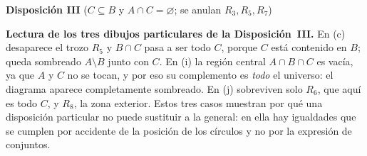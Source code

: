 \documentclass[11pt]{article}
\def\eA{(-1.1,0) circle (1.5)}
\def\eB{(0.9,0) circle (1.7)}
\def\eC{(1.35,0) circle (0.8)}
\def\Uniii{(-3.05,-2.15) rectangle (3.05,2.15)}
\newcommand{\eAin}{\clip \eA;}
\newcommand{\eAout}{\clip \Uniii \eA;}
\newcommand{\eBout}{\clip \Uniii \eB;}
\newcommand{\eCin}{\clip \eC;}
\newcommand{\pintaIII}{\fill[sombra] \Uniii;}
\newcommand{\marcoIII}{%
  \draw[thick] \Uniii;
  \draw[thick] \eA; \draw[thick] \eB; \draw[thick] \eC;
  \node at (-2.15,1.05) {$A$};
  \node at (0.15,1.35) {$B$};
  \node at (1.35,0) {$C$};
  \node at (-2.75,1.85) {$U$};
}
\begin{document}
\begin{center}
\textbf{Disposición III} \quad ($C\subseteq B$ y $A\cap C=\varnothing$; se anulan $R_{3},R_{5},R_{7}$)

\vspace{2mm}
\hspace{4mm}
\hspace{4mm}
\end{center}

\begin{nota}
\textbf{Lectura de los tres dibujos particulares de la Disposición~III.}
En (c) desaparece el trozo $R_{5}$ y $B\cap C$ pasa a ser todo $C$, porque $C$ está contenido en
$B$; queda sombreado $A\setminus B$ junto con $C$. En (i) la región central $A\cap B\cap C$ es
vacía, ya que $A$ y $C$ no se tocan, y por eso su complemento es \emph{todo} el universo: el
diagrama aparece completamente sombreado. En (j) sobreviven solo $R_{6}$, que aquí es todo $C$,
y $R_{8}$, la zona exterior. Estos tres casos muestran por qué una disposición particular no
puede sustituir a la general: en ella hay igualdades que se cumplen por accidente de la posición
de los círculos y no por la expresión de conjuntos.
\end{nota}
\end{document}
